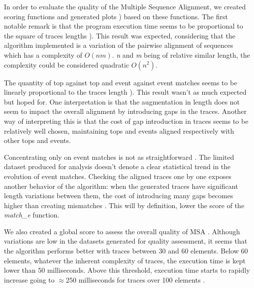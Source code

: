 \documentclass[12pt,a4paper]{article}
\begin{document}
In order to evaluate the quality of the Multiple Sequence Alignment, we created scoring functions and generated plots {)} based on these functions.
The first notable remark is that the program execution time seems to be proportional to the square of traces lengths {)}.
This result was expected, considering that the algorithm implemented is a variation of the pairwise alignment of sequences which has a complexity of $O(nm)$.
\emph{n} and \emph{m} being of relative similar length, the complexity could be considered quadratic $O(n^2)$.

The quantity of top against top and event against event matches seems to be linearly proportional to the traces length {)}.
This result wasn't as much expected but hoped for.
One interpretation is that the augmentation in length does not seem to impact the overall alignment by introducing gaps in the traces.
Another way of interpreting this is that the cost of gap introduction in traces seems to be relatively well chosen, maintaining tops and events aligned respectively with other tops and events.

Concentrating only on event matches is not as straightforward {}.
The limited dataset produced for analysis doesn't denote a clear statistical trend in the evolution of event matches.
Checking the aligned traces one by one exposes another behavior of the algorithm:
when the generated traces have significant length variations between them, the cost of introducing many gaps becomes higher than creating mismatches {}.
This will by definition, lower the score of the \emph{match\_e} function.

We also created a global score to assess the overall quality of MSA {}.
Although variations are low in the datasets generated for quality assessment, it seems that the algorithm performs better with traces between 30 and 60 elements.
Below 60 elements, whatever the inherent complexity of traces, the execution time is kept lower than 50 milliseconds.
Above this threshold, execution time starts to rapidly increase going to $\approx$250 milliseconds for traces over 100 elements {}. 


\end{document}
